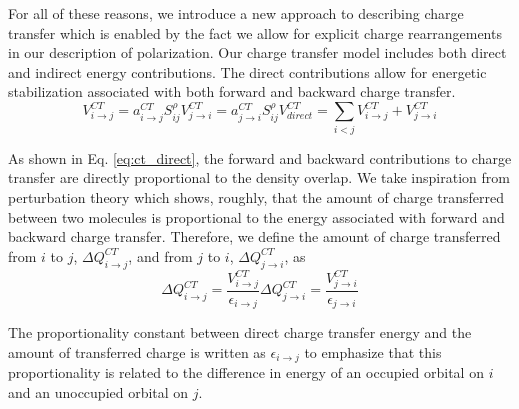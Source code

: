 \documentclass[journal=jacsat,manuscript=article]{achemso}
\begin{document}
For all of these reasons, we introduce a new approach to describing charge transfer
which is enabled by the fact we allow for explicit charge rearrangements in our
description of polarization. Our charge transfer model includes both direct and
indirect energy contributions. The direct contributions allow for energetic stabilization
associated with both forward and backward charge transfer.
\begin{subequations}
  \begin{equation}
  V^{CT}_{i\rightarrow j}=a_{i\rightarrow j}^{CT}S_{ij}^\rho
\end{equation}
\begin{equation}
  V^{CT}_{j\rightarrow i}=a_{j\rightarrow i}^{CT}S_{ij}^\rho
\end{equation}
\begin{equation}
  V^{CT}_{direct}=\sum_{i<j}V^{CT}_{i\rightarrow j}+V^{CT}_{j\rightarrow i}
\end{equation}
  \label{eq:ct_direct}
\end{subequations}

As shown in Eq. \ref{eq:ct_direct}, the forward and backward contributions to
charge transfer are directly proportional to the density overlap.
We take inspiration from perturbation theory which shows, roughly, that
the amount of charge transferred between two molecules is proportional to the
energy associated with forward and backward charge transfer.\cite{khaliullin2007unravelling,khaliullin2008analysis,khaliullin2009electron}
Therefore, we define the amount of charge transferred from $i$ to $j$, $\Delta Q^{CT}_{i\rightarrow j}$,
and from $j$ to $i$, $\Delta Q^{CT}_{j\rightarrow i}$, as
\begin{subequations}
  \begin{equation}
  \Delta Q^{CT}_{i\rightarrow j}=\frac{V^{CT}_{i\rightarrow j}}{\epsilon_{i\rightarrow j}}
\end{equation}
\begin{equation}
  \Delta Q^{CT}_{j\rightarrow i}=\frac{V^{CT}_{j\rightarrow i}}{\epsilon_{j\rightarrow i}}
\end{equation}
\end{subequations}

The proportionality constant between direct charge transfer
energy and the amount of transferred charge is written as $\epsilon_{i\rightarrow j}$
to emphasize that this proportionality is related to the difference in energy
of an occupied orbital on $i$ and an unoccupied orbital on $j$.\cite{khaliullin2007unravelling}
\end{document}
